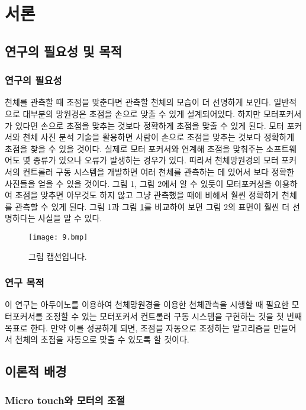 \section{서론}

\subsection{연구의 필요성 및 목적}

\subsubsection{연구의 필요성}

천체를 관측할 때 초점을 맞춘다면 관측할 천체의 모습이 더 선명하게 보인다. 일반적으로 대부분의 망원경은 초점을 손으로 맞출 수 있게 설계되어있다. 하지만 모터포커서가 있다면 손으로 초점을 맞추는 것보다 정확하게 초점을 맞출 수 있게 된다. 모터 포커서와 천체 사진 분석 기술을 활용하면 사람이 손으로 초점을 맞추는 것보다 정확하게 초점을 찾을 수 있을 것이다. 실제로 모터 포커서와 연계해 초점을 맞춰주는 소프트웨어도 몇 종류가 있으나 오류가 발생하는 경우가 있다. 따라서 천체망원경의 모터 포커서의 컨트롤러 구동 시스템을 개발하면 여러 천체를 관측하는 데 있어서 보다 정확한 사진들을 얻을 수 있을 것이다.
그림 1, 그림 2에서 알 수 있듯이 모터포커싱을 이용하여 초점을 맞추면 아무것도 하지 않고 그냥 관측했을 때에 비해서 훨씬 정확하게 천체를 관측할 수 있게 된다. 그림 1과 그림 \ref{fig:9}를 비교하여 보면 그림 2의 표면이 훨씬 더 선명하다는 사실을 알 수 있다.
\begin{figure}
	\texttt{[image: 9.bmp]}
	\caption{그림 캡션입니다.}
	\label{fig:9}
\end{figure}

\subsubsection{연구 목적}

이 연구는 아두이노를 이용하여 천체망원경을 이용한 천체관측을 시행할 때 필요한 모터포커서를 조정할 수 있는 모터포커서 컨트롤러 구동 시스템을 구현하는 것을 첫 번째 목표로 한다. 만약 이를 성공하게 되면, 초점을 자동으로 조정하는 알고리즘을 만들어서 천체의 초점을 자동으로 맞출 수 있도록 할 것이다.

\subsection{이론적 배경}

\subsubsection{Micro touch와 모터의 조절}

